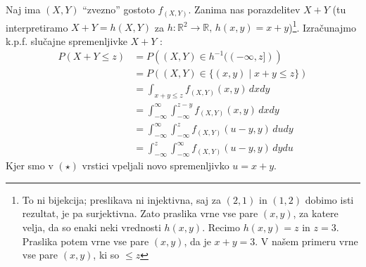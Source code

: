 \documentclass[12pt]{book}
\theoremstyle{definition}
\theoremstyle{plain}
\theoremstyle{plain}
\theoremstyle{plain}
\theoremstyle{remark}
\begin{document}
\begin{zgled}
    Naj ima $(X,Y)$ “zvezno” gostoto $f_{(X,Y)}$. Zanima nas porazdelitev $X+Y$ (tu interpretiramo $X+Y = h(X,Y)$ za $h: \mathbb{R}^2 \rightarrow \mathbb{R}, \, h(x, y)=x+y$)\footnote[5]{To ni bijekcija; preslikava ni injektivna, saj za $(2, 1)$ in $(1, 2)$ dobimo isti rezultat, je pa surjektivna. Zato praslika vrne vse pare $(x,y)$, za katere velja, da so enaki neki vrednosti $h(x,y)$. Recimo $h(x,y)=z$ in $z=3$. Praslika potem vrne vse pare $(x,y)$, da je $x+y=3$. V našem primeru vrne vse pare $(x,y)$, ki so $\leq z$}. Izračunajmo k.p.f. slučajne spremenljivke $X+Y$ :
    \begin{align*}
        P(X+Y \leq z) &= P\left((X, Y) \in h^{-1}((-\infty, z])\right) \\ 
        &= P((X, Y) \in\{(x, y) \mid x+y \leq z\}) \\
        &= \int_{x+y \leq z} f_{(X, Y)}(x, y) \,d x d y \\
        &=\int_{-\infty}^{\infty} \int_{-\infty}^{z-y} f_{(X, Y)}(x, y) \, d x d y \tag{$\star$} \\
        &=\int_{-\infty}^{\infty} \int_{-\infty}^z f_{(X, Y)}(u-y, y) \, d u d y \\
        &=\int_{-\infty}^z \int_{-\infty}^{\infty} f_{(X, Y)}(u-y, y) \, d y d u
    \end{align*}
    Kjer smo v $(\star)$ vrstici vpeljali novo spremenljivko $u=x+y$. 

    \begin{figure}[H]
        \centering
\end{figure}
\end{zgled}
\end{document}
